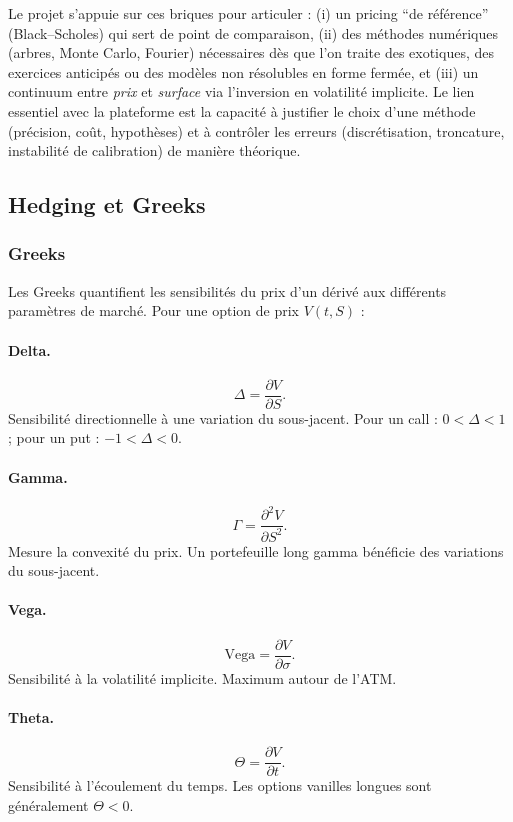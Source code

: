 \documentclass[11pt,a4paper]{article}
\newcommand{\1}{\mathbf{1}}
\begin{document}
Le projet s'appuie sur ces briques pour articuler : (i) un pricing ``de r\'ef\'erence'' (Black--Scholes) qui sert de point de comparaison,
(ii) des m\'ethodes num\'eriques (arbres, Monte Carlo, Fourier) n\'ecessaires d\`es que l'on traite des exotiques, des exercices anticip\'es
ou des mod\`eles non r\'esolubles en forme ferm\'ee, et (iii) un continuum entre \emph{prix} et \emph{surface} via l'inversion en volatilité implicite.
Le lien essentiel avec la plateforme est la capacit\'e \`a justifier le choix d'une m\'ethode (pr\'ecision, co\^ut, hypoth\`eses) et \`a contr\^oler
les erreurs (discr\'etisation, troncature, instabilit\'e de calibration) de mani\`ere th\'eorique.

\subsection{Hedging et Greeks}


\subsubsection{Greeks}

Les Greeks quantifient les sensibilités du prix d'un dérivé aux différents
paramètres de marché. Pour une option de prix $V(t,S)$ :

\paragraph{Delta.}
\[
\Delta = \frac{\partial V}{\partial S}.
\]
Sensibilité directionnelle à une variation du sous-jacent.
Pour un call : $0 < \Delta < 1$ ; pour un put : $-1 < \Delta < 0$.

\paragraph{Gamma.}
\[
\Gamma = \frac{\partial^2 V}{\partial S^2}.
\]
Mesure la convexité du prix.
Un portefeuille long gamma bénéficie des variations du sous-jacent.

\paragraph{Vega.}
\[
\text{Vega} = \frac{\partial V}{\partial \sigma}.
\]
Sensibilité à la volatilité implicite. Maximum autour de l'ATM.

\paragraph{Theta.}
\[
\Theta = \frac{\partial V}{\partial t}.
\]
Sensibilité à l'écoulement du temps. Les options vanilles longues sont
généralement $\Theta < 0$.
\end{document}
